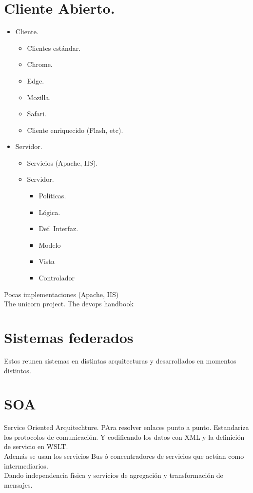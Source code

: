 \newpage
\chapter{Cliente Abierto.}
\begin{itemize}
	\item Cliente.
	\begin{itemize}
		\item Clientes est\'{a}ndar.
		\item Chrome.
		\item Edge.
		\item Mozilla.
		\item Safari.
		\item Cliente enriquecido (Flash, etc).
	\end{itemize}
	\item Servidor.
	\begin{itemize}
		\item Servicios (Apache, IIS).
		\item Servidor.
		\begin{itemize}
			\item Pol\'{i}ticas.
			\item L\'{o}gica.
			\item Def. Interfaz.
			\item Modelo
			\item Vista
			\item Controlador
		\end{itemize}
	\end{itemize}
\end{itemize}
Pocas implementaciones (Apache, IIS)\\
The unicorn project.
The devops handbook
\chapter{Sistemas federados}
Estos reunen sistemas en distintas arquitecturas y desarrollados en momentos distintos.\\

\chapter{SOA}
Service Oriented Arquitechture.
PAra resolver enlaces punto a punto. Estandariza los protocolos de comunicaci\'{o}n.
Y codificando los datos con XML y la definici\'{o}n de servicio en WSLT.\\
Adem\'{a}s se usan los servicios Bus \'{o} concentradores de servicios que act\'{u}an como intermediarios.\\
Dando independencia f\'{i}sica y servicios de agregaci\'{o}n y transformaci\'{o}n de mensajes.\\

